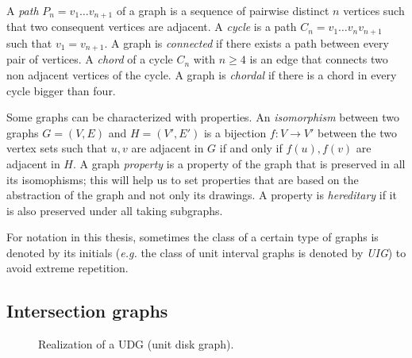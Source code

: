 A \emph{path} $P_n = v_1\dots v_{n+1}$ of a graph is a sequence of pairwise distinct $n$ vertices such that two consequent vertices are adjacent. A \emph{cycle} is a path $C_n = v_1\dots v_nv_{n+1}$ such that $v_1=v_{n+1}$. A graph is \emph{connected} if there exists a path between every pair of vertices. A \emph{chord} of a cycle $C_n$ with $n \geqslant 4$ is an edge that connects two non adjacent vertices of the cycle. A graph is \emph{chordal} if there is a chord in every cycle bigger than four.

Some graphs can be characterized with properties. An \emph{isomorphism} between two graphs $G= (V,E)$ and $H = (V', E')$ is a bijection $f : V \to V'$ between the two vertex sets such that $u,v$ are adjacent in $G$ if and only if $f(u), f(v)$ are adjacent in $H$. A graph \emph{property} is a property of the graph that is preserved in all its isomophisms; this will help us to set properties that are based on the abstraction of the graph and not only its drawings. A property is \emph{hereditary} if it is also preserved under all taking subgraphs.

For notation in this thesis, sometimes the class of a certain type of graphs is denoted by its initials (\textit{e.g.} the class of unit interval graphs is denoted by \emph{UIG}) to avoid extreme repetition.

\subsection{Intersection graphs}

\begin{figure}
\centering

\begin{scaletikzpicturetowidth}{\textwidth}
\end{scaletikzpicturetowidth}

\caption{Realization of a UDG (unit disk graph).}
\label{fig:udg}
\end{figure}


